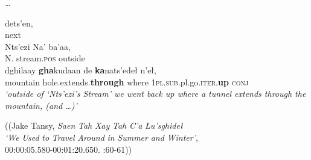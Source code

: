 \begin{exe}
\begin{xlistn}
\sn  \ldots

 \gll  dets’en,\\
    next\\

    \gll    Nts’ezi Na’ ba’aa,\\
    N.       stream.\textsc{pos}  outside\\

    \gll    dghilaay   \textbf{gha}kudaan de \textbf{ka}nats’edeł n'eł,\\
        mountain   hole.extends.\textbf{through} where \textsc{1pl.sub}.pl.go.\textsc{iter}.\textbf{up}  \textsc{conj} \\

\glt \textit{‘outside of ‘Nts’ezi’s Stream’ we went back up where a tunnel extends through the mountain, (and \ldots)’}

\end{xlistn}

\begin{flushright}
((Jake Tansy, \textit{Saen} \textit{Tah} \textit{Xay} \textit{Tah} \textit{C’a} \textit{Łu’sghideł\\
‘We} \textit{Used} \textit{to} \textit{Travel} \textit{Around} \textit{in} \textit{Summer} \textit{and} \textit{Winter’},\\
00:00:05.580-00:01:20.650. \citealt{Kari2010}:60-61))
\end{flushright}

\end{exe}

